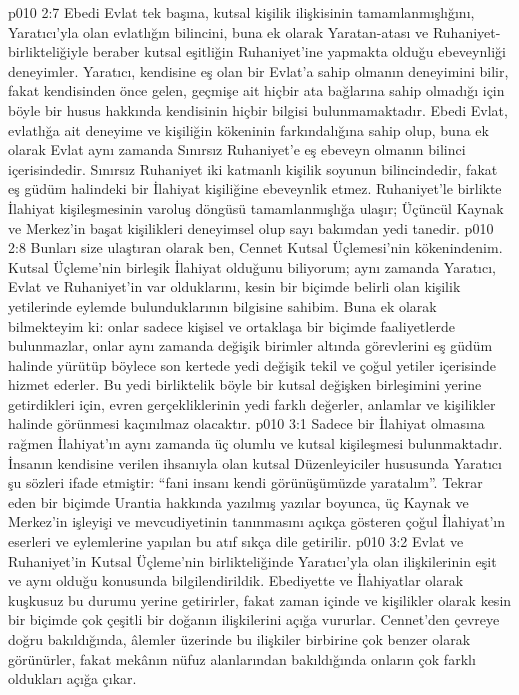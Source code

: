 \vs p010 2:7 Ebedi Evlat tek başına, kutsal kişilik ilişkisinin tamamlanmışlığını, Yaratıcı’yla olan evlatlığın bilincini, buna ek olarak Yaratan\hyp{}atası ve Ruhaniyet\hyp{}birlikteliğiyle beraber kutsal eşitliğin Ruhaniyet’ine yapmakta olduğu ebeveynliği deneyimler. Yaratıcı, kendisine eş olan bir Evlat’a sahip olmanın deneyimini bilir, fakat kendisinden önce gelen, geçmişe ait hiçbir ata bağlarına sahip olmadığı için böyle bir husus hakkında kendisinin hiçbir bilgisi bulunmamaktadır. Ebedi Evlat, evlatlığa ait deneyime ve kişiliğin kökeninin farkındalığına sahip olup, buna ek olarak Evlat aynı zamanda Sınırsız Ruhaniyet’e eş ebeveyn olmanın bilinci içerisindedir. Sınırsız Ruhaniyet iki katmanlı kişilik soyunun bilincindedir, fakat eş güdüm halindeki bir İlahiyat kişiliğine ebeveynlik etmez. Ruhaniyet’le birlikte İlahiyat kişileşmesinin varoluş döngüsü tamamlanmışlığa ulaşır; Üçüncül Kaynak ve Merkez’in başat kişilikleri deneyimsel olup sayı bakımdan yedi tanedir.
\vs p010 2:8 Bunları size ulaştıran olarak ben, Cennet Kutsal Üçlemesi’nin kökenindenim. Kutsal Üçleme’nin birleşik İlahiyat olduğunu biliyorum; aynı zamanda Yaratıcı, Evlat ve Ruhaniyet’in var olduklarını, kesin bir biçimde belirli olan kişilik yetilerinde eylemde bulunduklarının bilgisine sahibim. Buna ek olarak bilmekteyim ki: onlar sadece kişisel ve ortaklaşa bir biçimde faaliyetlerde bulunmazlar, onlar aynı zamanda değişik birimler altında görevlerini eş güdüm halinde yürütüp böylece son kertede yedi değişik tekil ve çoğul yetiler içerisinde hizmet ederler. Bu yedi birliktelik böyle bir kutsal değişken birleşimini yerine getirdikleri için, evren gerçekliklerinin yedi farklı değerler, anlamlar ve kişilikler halinde görünmesi kaçınılmaz olacaktır.
\vs p010 3:1 Sadece bir İlahiyat olmasına rağmen İlahiyat’ın aynı zamanda üç olumlu ve kutsal kişileşmesi bulunmaktadır. İnsanın kendisine verilen ihsanıyla olan kutsal Düzenleyiciler hususunda Yaratıcı şu sözleri ifade etmiştir: “fani insanı kendi görünüşümüzde yaratalım”. Tekrar eden bir biçimde Urantia hakkında yazılmış yazılar boyunca, üç Kaynak ve Merkez’in işleyişi ve mevcudiyetinin tanınmasını açıkça gösteren çoğul İlahiyat’ın eserleri ve eylemlerine yapılan bu atıf sıkça dile getirilir.
\vs p010 3:2 Evlat ve Ruhaniyet’in Kutsal Üçleme’nin birlikteliğinde Yaratıcı’yla olan ilişkilerinin eşit ve aynı olduğu konusunda bilgilendirildik. Ebediyette ve İlahiyatlar olarak kuşkusuz bu durumu yerine getirirler, fakat zaman içinde ve kişilikler olarak kesin bir biçimde çok çeşitli bir doğanın ilişkilerini açığa vururlar. Cennet’den çevreye doğru bakıldığında, âlemler üzerinde bu ilişkiler birbirine çok benzer olarak görünürler, fakat mekânın nüfuz alanlarından bakıldığında onların çok farklı oldukları açığa çıkar.
